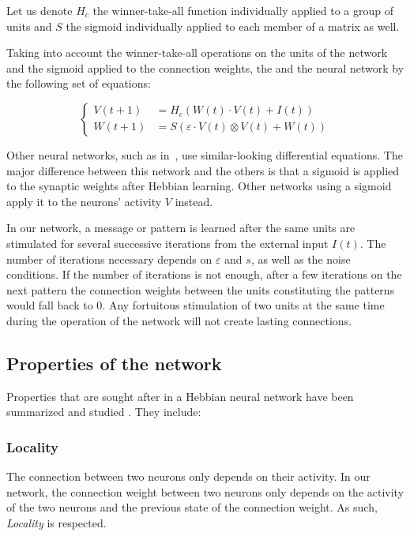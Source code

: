 \documentclass[journal]{IEEEtran}
\begin{document}
Let us denote $H_c$ the winner-take-all function individually applied to a group of units and $S$ the sigmoid individually applied to each member of a matrix as well.
 
Taking into account the winner-take-all operations on the units of the network and the sigmoid applied to the connection weights, the and the neural network by the following set of equations:

\begin{equation}
\left\{\begin{array}{ll} V(t+1) &= H_c\left(W(t) \cdot V(t) + I(t)\right) \\
 W(t+1) &= S\left(\varepsilon \cdot V(t) \otimes V(t) + W(t)\right)\end{array}\right.
\end{equation}

Other neural networks, such as in~\cite{galtier2012hebbian}, use similar-looking differential equations. The major difference between this network and the others is that a sigmoid is applied to the synaptic weights after Hebbian learning. Other networks using a sigmoid apply it to the neurons' activity $V$ instead.

In our network, a message or pattern is learned after the same units are stimulated for several successive iterations from the external input $I(t)$. The number of iterations necessary depends on $\varepsilon$ and $s$, as well as the noise conditions. If the number of iterations is not enough, after a few iterations on the next pattern the connection weights between the units constituting the patterns would fall back to $0$. Any fortuitous stimulation of two units at the same time during the operation of the network will not create lasting connections.

\subsection{Properties of the network}

Properties that are sought after in a Hebbian neural network have been
summarized and studied \cite{gerstner2002mathematical}. They include:

\subsubsection{Locality} The connection between two neurons only
depends on their activity. In our network, the connection weight between two neurons only depends on the activity of the two neurons and the previous state of the connection weight. As such, \emph{Locality} is respected.
\end{document}
